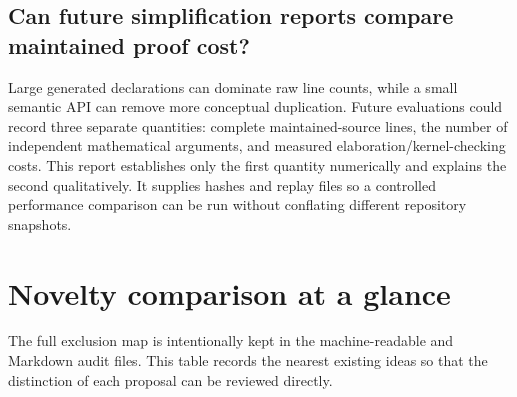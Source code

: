 \documentclass[11pt,letterpaper]{article}
\begin{document}
\subsection{Can future simplification reports compare maintained proof cost?}

Large generated declarations can dominate raw line counts, while a small
semantic API can remove more conceptual duplication. Future evaluations
could record three separate quantities: complete maintained-source lines,
the number of independent mathematical arguments, and measured
elaboration/kernel-checking costs. This report establishes only the first
quantity numerically and explains the second qualitatively. It supplies
hashes and replay files so a controlled performance comparison can be run
without conflating different repository snapshots.

\appendix
\section{Novelty comparison at a glance}

The full exclusion map is intentionally kept in the machine-readable and
Markdown audit files. This table records the nearest existing ideas so that
the distinction of each proposal can be reviewed directly.
\end{document}
